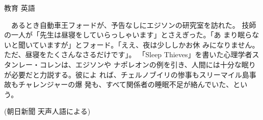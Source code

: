 \documentclass[fleqn]{jbook}
\begin{document}
\begin{question}{教育 英語}{}
\begin{subquestions}
    　あるとき自動車王フォードが、予告なしにエジソンの研究室を訪れた。
技師の一人が「先生は昼寝をしていらっしゃいます」とさえぎった。「あ
まり眠らないと聞いていますが」とフォード。「ええ、夜は少ししかお休
みになりません。ただ、昼寝をたくさんなさるだけです」。
「Sleep Thieves」を書いた心理学者スタンレー・コレンは、エジソンや
ナポレオンの例を引き、人間には十分な眠りが必要だと力説する。彼によ
れば、チェルノブイリの惨事もスリーマイル島事故もチャレンジャーの爆
発も、すべて関係者の睡眠不足が絡んでいた、という。
%
  \begin{flushright}
        (朝日新聞  天声人語による)
  \end{flushright}

\end{subquestions}
\end{question}
\end{document}
